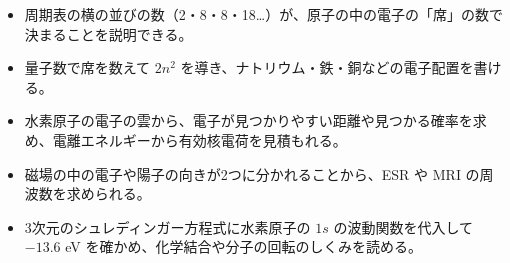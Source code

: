 \newcommand\txhcell[4]{\filldraw[fill=#3, draw=bkInk!70, line width=0.35pt] ({(#1-1)*6.3},{-(#2-1)*5.6}) rectangle ++(6.3,-5.6);
  \node[font=\sffamily\footnotesize, text=bkInk, inner sep=0pt] at ({(#1-1)*6.3+3.15},{-(#2-1)*5.6-2.8}) {#4};}
\makeatother


\begin{goal}
\begin{itemize}[label={\color{bkTheme}●}, leftmargin=1.6\zw, itemsep=0pt, topsep=1pt]
\item {}\enspace 周期表の横の並びの数（2・8・8・18…）が、原子の中の電子の「席」の数で決まることを説明できる。
\item {}\enspace 量子数で席を数えて $2n^2$ を導き、ナトリウム・鉄・銅などの電子配置を書ける。
\item {}\enspace 水素原子の電子の雲から、電子が見つかりやすい距離や見つかる確率を求め、電離エネルギーから有効核電荷を見積もれる。
\item {}\enspace 磁場の中の電子や陽子の向きが2つに分かれることから、ESR や MRI の周波数を求められる。
\item {}\enspace 3次元のシュレディンガー方程式に水素原子の $1s$ の波動関数を代入して $-13.6$ eV を確かめ、化学結合や分子の回転のしくみを読める。
\end{itemize}
\end{goal}


